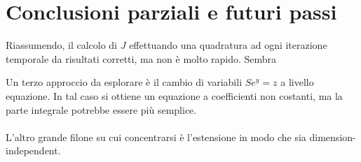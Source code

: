 \documentclass[a4paper,10pt]{article}
\begin{document}
\section{Conclusioni parziali e futuri passi}

Riassumendo, il calcolo di $J$ effettuando una quadratura ad ogni iterazione temporale da risultati corretti, ma non è molto rapido. Sembra 

Un terzo approccio da esplorare è il cambio di variabili $Se^y=z$ a livello equazione. In tal caso si ottiene un equazione a coefficienti non costanti, ma la parte integrale potrebbe essere più semplice.
\\ \\
L'altro grande filone su cui concentrarsi è l'estensione in modo che sia dimension-independent.
\end{document}
